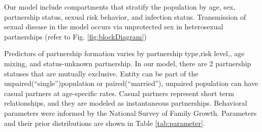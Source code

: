 \documentclass{article}
\begin{document}
\begin{normalsize}
	Our model include compartments that stratify the population by age, sex, partnership status, sexual risk behavior, and infection status. Transmission of sexual disease in the model occurs via unprotected sex in heterosexual partnerships (refer to Fig. \ref{fig:blockDiagram})
	
	Predictors of partnership formation varies by partnership type,risk level,, age mixing, and status-unknown partnership. In our model, there are 2 partnership statuses that are mutually exclusive. Entity can be part of the unpaired(“single”)population or paired(“married”), unpaired population can have casual partners at age-specific rates. Casual partners represent short term relationships, and they are modeled as instantaneous partnerships. Behavioral parameters were informed by the National Survey of Family Growth. Parameters and their prior distributions \cite{galer_et2019} are shown in Table \ref{tab:parameter}. 
	

\end{normalsize}
\end{document}
